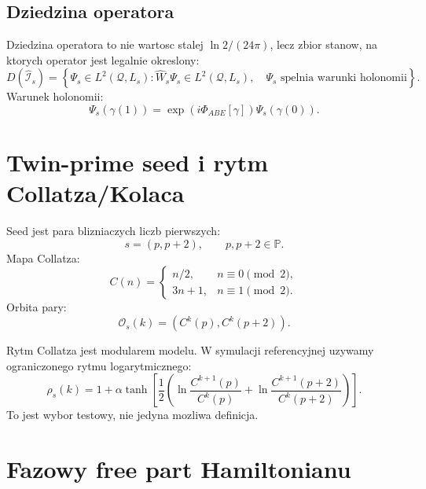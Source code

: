 \documentclass[11pt,a4paper]{article}
\newcommand{\Iop}{\hat{\mathcal I}}
\newcommand{\Wop}{\hat W}
\newcommand{\Q}{\mathcal Q}
\begin{document}
\subsection{Dziedzina operatora}

Dziedzina operatora to nie wartosc stalej $\ln2/(24\pi)$, lecz zbior stanow, na ktorych operator jest legalnie okreslony:
\begin{equation}
D(\Iop_s)=
\left\{
\Psi_s\in L^2(\Q,L_s):
\Wop_s\Psi_s\in L^2(\Q,L_s),\quad
\Psi_s\text{ spelnia warunki holonomii}
\right\}.
\end{equation}
Warunek holonomii:
\begin{equation}
\Psi_s(\gamma(1))
=
\exp\left(i\Phi_{ABE}[\gamma]\right)
\Psi_s(\gamma(0)).
\end{equation}

\section{Twin-prime seed i rytm Collatza/Kolaca}

Seed jest para blizniaczych liczb pierwszych:
\begin{equation}
\boxed{s=(p,p+2),\qquad p,p+2\in\mathbb P.}
\end{equation}
Mapa Collatza:
\begin{equation}
C(n)=
\begin{cases}
n/2, & n\equiv 0\pmod 2,\\
3n+1, & n\equiv 1\pmod 2.
\end{cases}
\end{equation}
Orbita pary:
\begin{equation}
\mathcal O_s(k)=\left(C^k(p),C^k(p+2)\right).
\end{equation}

Rytm Collatza jest modularem modelu. W symulacji referencyjnej uzywamy ograniczonego rytmu logarytmicznego:
\begin{equation}
\rho_s(k)=1+\alpha\tanh\left[\frac12\left(
\ln\frac{C^{k+1}(p)}{C^k(p)}+
\ln\frac{C^{k+1}(p+2)}{C^k(p+2)}
\right)\right].
\end{equation}
To jest wybor testowy, nie jedyna mozliwa definicja.

\section{Fazowy free part Hamiltonianu}
\end{document}
